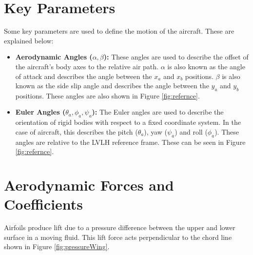 \section{Key Parameters}
\label{subsubsec:keyparam}
Some key parameters are used to define the motion of the aircraft. These are explained below: 
\begin{itemize}
    \item \textbf{Aerodynamic Angles ($\alpha, \beta$):} These angles are used to describe the offset of the aircraft's body axes to the relative air path. $\alpha$ is also known as the angle of attack and describes the angle between the $x_a$ and $x_b$ positions. $\beta$ is also known as the side slip angle and describes the angle between the $y_a$ and $y_b$ positions. These angles are also shown in Figure \ref{fig:refernce}.
    \item \textbf{Euler Angles ($\theta_a, \phi_a, \psi_a $):} The Euler angles are used to describe the orientation of rigid bodies with respect to a fixed coordinate system. In the case of aircraft, this describes the pitch ($\theta_a$), yaw ($\psi_a$) and roll ($\phi_a$). These angles are relative to the \acrshort{LVLH} reference frame. These can be seen in Figure \ref{fig:refernce}.
\end{itemize}

\section{Aerodynamic Forces and Coefficients}
Airfoils produce lift due to a pressure difference between the upper and lower surface in a moving fluid. This lift force acts perpendicular to the chord line shown in Figure \ref{fig:pressureWing}.



